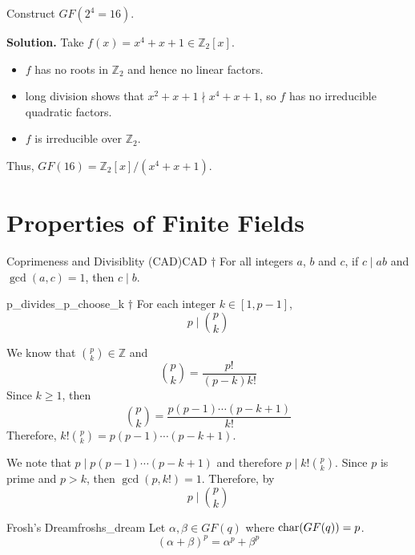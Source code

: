 
\begin{Example}{}{}
    Construct $ GF(2^4=16) $.

    \textbf{Solution.} Take $ f(x)=x^4+x+1\in\mathbb{Z}_2[x] $.
    \begin{itemize}
        \item $ f $ has no roots in $ \mathbb{Z}_2 $ and hence no linear factors.
        \item long division shows that $ x^2+x+1\nmid x^4+x+1 $, so $ f $
              has no irreducible quadratic factors.
        \item $ f $ is irreducible over $ \mathbb{Z}_2 $.
    \end{itemize}
    Thus, $ GF(16)=\mathbb{Z}_2[x]/(x^4+x+1) $.
\end{Example}

\section{Properties of Finite Fields}

\begin{Proposition}{Coprimeness and Divisiblity (CAD)}{CAD}
    $ \dagger $ For all integers $ a $, $ b $ and $ c $, if $ c\mid ab $
    and $ \gcd(a,c)=1 $, then $ c\mid b $.
\end{Proposition}

\begin{Lemma}{}{p_divides_p_choose_k}
    $ \dagger $ For each integer $ k\in[1,p-1] $,
    \[ p\mid \binom{p}{k} \]
\end{Lemma}

\begin{Proof}{}{}
    We know that $ \binom{p}{k}\in\mathbb{Z} $ and
    \[ \binom{p}{k}=\frac{p!}{(p-k)k!} \]
    Since $ k\geqslant 1 $, then
    \[ \binom{p}{k}=\frac{p(p-1)\cdots(p-k+1)}{k!} \]
    Therefore, $ k!\binom{p}{k}=p(p-1)\cdots(p-k+1) $.

    We note that $ p\mid p(p-1)\cdots(p-k+1) $ and therefore
    $ p\mid k!\binom{p}{k} $. Since $ p $ is prime and $ p>k $,
    then $ \gcd(p,k!)=1 $. Therefore, by~
    \[ p\mid \binom{p}{k} \]
\end{Proof}

\begin{Theorem}{Frosh's Dream}{froshs_dream}
    Let $ \alpha,\beta\in GF(q) $ where $ \operatorname{char}(GF(q))=p $.
    \[ (\alpha + \beta)^p=\alpha^p+\beta^p \]
\end{Theorem}


